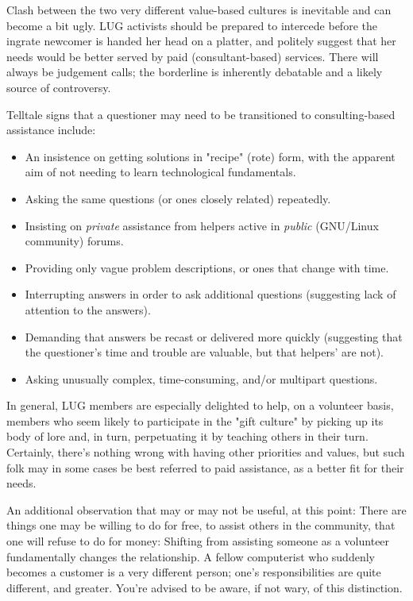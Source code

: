 Clash between the two very different value-based cultures is inevitable
and can become a bit ugly.  LUG activists should be prepared to intercede
before the ingrate newcomer is handed her head on a platter, and
politely suggest that her needs would be better served by paid
(consultant-based) services.  There will always be judgement calls;
the borderline is inherently debatable and a likely source of
controversy.

Telltale signs that a questioner may need to be transitioned to consulting-based assistance include:

\begin{itemize}
\item An insistence on getting solutions in "recipe" (rote) form, 
with the apparent aim of not needing to learn technological 
fundamentals.
\item Asking the same questions (or ones closely related) repeatedly.
\item Insisting on {\itshape private\/} assistance from helpers active in
{\itshape public\/} (GNU/Linux community) forums.
\item Providing only vague problem descriptions, or ones that change with time.
\item Interrupting answers in order to ask additional questions 
(suggesting lack of attention to the answers).
\item Demanding that answers be recast or delivered more quickly 
(suggesting that the questioner's time and trouble are 
valuable, but that helpers' are not).
\item Asking unusually complex, time-consuming, and/or multipart 
questions.
\end{itemize}


In general, LUG members are especially delighted to help, on a volunteer
basis, members who seem likely to participate in the "gift
culture" by picking up its body of lore and, in turn, perpetuating it
by teaching others in their turn.  Certainly, there's nothing wrong with
having other priorities and values, but such folk may in some cases be
best referred to paid assistance, as a better fit for their needs.

An additional observation that may or may not be useful, at this point:
There are things one may be willing to do for free, to assist others in the
community, that one will refuse to do for money:  Shifting from
assisting someone as a volunteer fundamentally changes the relationship.
A fellow computerist who suddenly becomes a customer is a very different
person; one's responsibilities are quite different, and greater.  You're
advised to be aware, if not wary, of this distinction.






